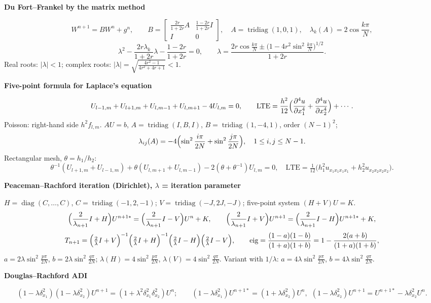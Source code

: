 \documentclass[10pt,a4paper]{article}
\newcommand{\head}[1]{\par\smallskip\noindent\textbf{\color{blue!50!black}#1}\par\nobreak}
\begin{document}
\head{Du Fort--Frankel by the matrix method}
\[
  W^{n+1}=BW^n+g^n,\qquad
  B=\begin{bmatrix}\frac{2r}{1+2r}A&\frac{1-2r}{1+2r}I\\ I&0\end{bmatrix},\quad
  A=\operatorname{tridiag}(1,0,1),\quad \lambda_k(A)=2\cos\frac{k\pi}N,
\]
\[
  \lambda^2-\frac{2r\lambda_k}{1+2r}\lambda-\frac{1-2r}{1+2r}=0,
  \qquad
  \lambda=\frac{2r\cos\frac{k\pi}N\pm\bigl(1-4r^2\sin^2\frac{k\pi}N\bigr)^{1/2}}{1+2r}.
\]
Real roots: \(|\lambda|<1\);\; complex roots: \(|\lambda|=\sqrt{\frac{4r^2-1}{4r^2+4r+1}}<1\).

\head{Five-point formula for Laplace's equation}
\[
  U_{l-1,m}+U_{l+1,m}+U_{l,m-1}+U_{l,m+1}-4U_{l,m}=0,
  \qquad
  \text{LTE}=\frac{h^2}{12}\Bigl(\frac{\partial^4u}{\partial x_1^4}+\frac{\partial^4u}{\partial x_2^4}\Bigr)+\cdots.
\]
Poisson: right-hand side \(h^2f_{l,m}\).\;
\(AU=b\), \(A=\operatorname{tridiag}(I,B,I)\), \(B=\operatorname{tridiag}(1,-4,1)\), order \((N-1)^2\);
\[
  \lambda_{ij}(A)=-4\Bigl(\sin^2\frac{i\pi}{2N}+\sin^2\frac{j\pi}{2N}\Bigr),\quad 1\le i,j\le N-1.
\]
Rectangular mesh, \(\theta=h_1/h_2\):
\[
  \theta^{-1}(U_{l+1,m}+U_{l-1,m})+\theta(U_{l,m+1}+U_{l,m-1})-2(\theta+\theta^{-1})U_{l,m}=0,
  \quad
  \text{LTE}=\tfrac1{12}\bigl(h_1^2u_{x_1x_1x_1x_1}+h_2^2u_{x_2x_2x_2x_2}\bigr).
\]

\head{Peaceman--Rachford iteration (Dirichlet), \(\lambda\) = iteration parameter}
\(H=\operatorname{diag}(C,\dots,C)\), \(C=\operatorname{tridiag}(-1,2,-1)\);
\(V=\operatorname{tridiag}(-J,2J,-J)\); five-point system \((H+V)U=K\).
\[
  \Bigl(\frac2{\lambda_{n+1}}I+H\Bigr)U^{n+1*}=\Bigl(\frac2{\lambda_{n+1}}I-V\Bigr)U^n+K,
  \qquad
  \Bigl(\frac2{\lambda_{n+1}}I+V\Bigr)U^{n+1}=\Bigl(\frac2{\lambda_{n+1}}I-H\Bigr)U^{n+1*}+K,
\]
\[
  T_{n+1}=\Bigl(\tfrac2{\lambda}I+V\Bigr)^{-1}\Bigl(\tfrac2{\lambda}I+H\Bigr)^{-1}
  \Bigl(\tfrac2{\lambda}I-H\Bigr)\Bigl(\tfrac2{\lambda}I-V\Bigr),
  \qquad
  \text{eig}=\frac{(1-a)(1-b)}{(1+a)(1+b)}=1-\frac{2(a+b)}{(1+a)(1+b)},
\]
\(a=2\lambda\sin^2\frac{p\pi}{2N}\), \(b=2\lambda\sin^2\frac{q\pi}{2N}\);
\(\lambda(H)=4\sin^2\frac{p\pi}{2N}\), \(\lambda(V)=4\sin^2\frac{q\pi}{2N}\).
Variant with \(1/\lambda\): \(a=4\lambda\sin^2\frac{p\pi}{2N}\), \(b=4\lambda\sin^2\frac{q\pi}{2N}\).

\head{Douglas--Rachford ADI}
\[
  (1-\lambda\delta_{x_1}^2)(1-\lambda\delta_{x_2}^2)U^{n+1}=(1+\lambda^2\delta_{x_1}^2\delta_{x_2}^2)U^n;
  \qquad
  (1-\lambda\delta_{x_1}^2)U^{n+1*}=(1+\lambda\delta_{x_2}^2)U^n,\ \
  (1-\lambda\delta_{x_2}^2)U^{n+1}=U^{n+1*}-\lambda\delta_{x_2}^2U^n.
\]
\end{document}

